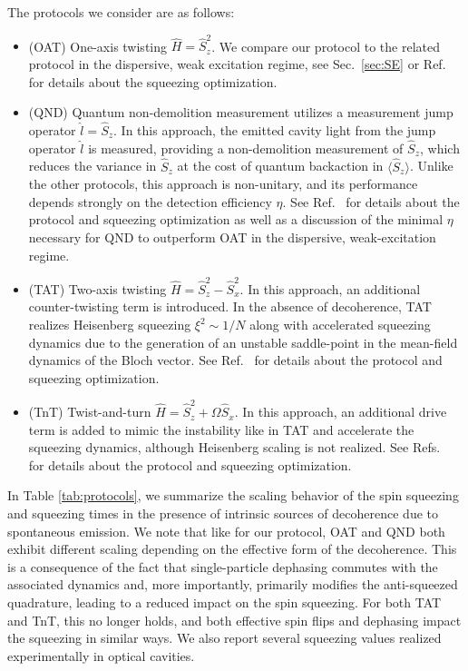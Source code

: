 The protocols we consider are as follows:
\begin{itemize}
    \item (OAT) One-axis twisting $\hat H = \hat S_z^2$. We compare our protocol to the related protocol in the dispersive, weak excitation regime, see Sec.~\ref{sec:SE} or Ref.~\cite{Barberena2023b} for details about the squeezing optimization.
    \item (QND) Quantum non-demolition measurement utilizes a measurement jump operator $\hat l = \hat S_z$. In this approach, the emitted cavity light from the jump operator $\hat l$ is measured, providing a non-demolition measurement of $\hat S_z$, which reduces the variance in $\hat S_z$ at the cost of quantum backaction in $\langle \hat S_z \rangle$. Unlike the other protocols, this approach is non-unitary, and its performance depends strongly on the detection efficiency $\eta$. See Ref.~\cite{Barberena2023b} for details about the protocol and squeezing optimization as well as a discussion of the minimal $\eta$ necessary for QND to outperform OAT in the dispersive, weak-excitation regime.
    \item (TAT) Two-axis twisting $\hat H = \hat S_z^2 - \hat S_x^2$. In this approach, an additional counter-twisting term is introduced. In the absence of decoherence, TAT realizes Heisenberg squeezing $\xi^2 \sim 1/N$ along with accelerated squeezing dynamics due to the generation of an unstable saddle-point in the mean-field dynamics of the Bloch vector. See Ref.~\cite{Borregaard2017a} for details about the protocol and squeezing optimization.
    \item (TnT) Twist-and-turn $\hat H = \hat S_z^2 + \Omega \hat S_x$. In this approach, an additional drive term is added to mimic the instability like in TAT and accelerate the squeezing dynamics, although Heisenberg scaling is not realized. See Refs.~\cite{Muessel2015,Hu2017,Barberena2022} for details about the protocol and squeezing optimization.
\end{itemize}

In Table \ref{tab:protocols}, we summarize the scaling behavior of the spin squeezing and squeezing times in the presence of intrinsic sources of decoherence due to spontaneous emission. We note that like for our protocol, OAT and QND both exhibit different scaling depending on the effective form of the decoherence. This is a consequence of the fact that single-particle dephasing commutes with the associated dynamics and, more importantly, primarily modifies the anti-squeezed quadrature, leading to a reduced impact on the spin squeezing. For both TAT and TnT, this no longer holds, and both effective spin flips and dephasing impact the squeezing in similar ways. We also report several squeezing values realized experimentally in optical cavities.

